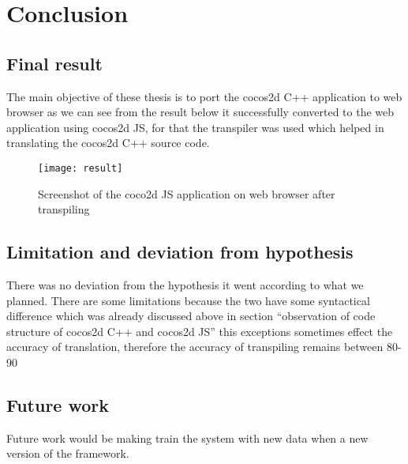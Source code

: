 \documentclass[23pt]{article}
\begin{document}
\newpage

\section{Conclusion}

\subsection{Final result}

{\Large The main objective of these thesis is to port the cocos2d C++ application to web browser as we can see from the result below it successfully converted to the web application using cocos2d JS, for that the transpiler was used which helped in translating the cocos2d C++ source code. \\  \par}


\begin{figure}[h]
\caption{Screenshot of the coco2d JS application on web browser after transpiling}
\centering
\texttt{[image: result]}
\end{figure}

\newpage

\subsection{Limitation and deviation from hypothesis}
{\Large There was no deviation from the hypothesis it went according to what we planned.
             There are some limitations because the two have some syntactical difference which was already discussed above in section “observation of code structure of cocos2d C++  and cocos2d JS” this exceptions sometimes effect the accuracy of translation, therefore  the accuracy of transpiling remains between 80-90%
\\  \par}

\subsection{Future work}
{\Large Future work would be making train the system with new data when a new version of the framework. \\  \par}
\end{document}
